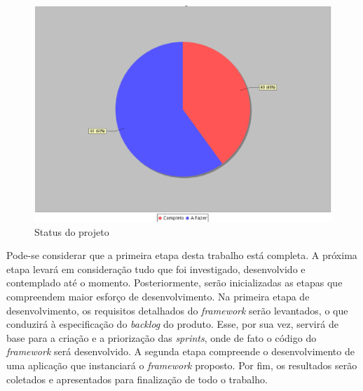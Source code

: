 \begin{figure}[!h]
	\centering
	\includegraphics[scale=0.5]{figuras/capitulo7/status_projeto.eps}
	\caption{Status do projeto}
	\label{status projeto}
\end{figure}

Pode-se considerar que a primeira etapa desta trabalho está completa. A próxima etapa levará em consideração tudo que foi investigado, desenvolvido e contemplado até o momento. Posteriormente, serão inicializadas as etapas que compreendem maior esforço de desenvolvimento. Na primeira etapa de desenvolvimento, os requisitos detalhados do \textit{framework} serão levantados, o que conduzirá à especificação do \textit{backlog} do produto. Esse, por sua vez, servirá de base para a criação e a priorização das \textit{sprints}, onde de fato o código do \textit{framework} será desenvolvido. A segunda etapa compreende o desenvolvimento de uma aplicação que instanciará o \textit{framework} proposto. Por fim, os resultados serão coletados e apresentados para finalização de todo o trabalho.
